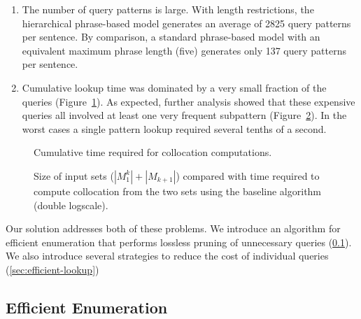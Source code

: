 \begin{enumerate}
	\item The number of query patterns is large.  With length restrictions, 
	the hierarchical phrase-based model generates an average of 
	2825 query patterns per sentence.  By comparison, a standard
	phrase-based model with an equivalent maximum phrase length
	(five) generates only 137 query patterns per sentence.

	\item Cumulative lookup time was dominated by a very small 
	fraction of the queries (Figure~\ref{fig:cumulative-baseline-timing}).  
	As expected, further analysis showed that these expensive 
	queries all involved at least one very frequent subpattern
	(Figure~\ref{fig:scatterplot-baseline}).
	In the worst cases a single pattern lookup required several 
	tenths of a second.
\end{enumerate}

\figpreamble
\begin{figure}
	\figfontsize{
	\begin{center}
		
	\end{center}}
	\figpostamble
	\caption{Cumulative time required for collocation computations.}
	\label{fig:cumulative-baseline-timing}
\end{figure}

\figpreamble
\begin{figure}
	\figfontsize{
	\begin{center}
		
	\end{center}}
	\figpostamble
	\caption{Size of input sets ($|M_1^k| + |M_{k+1}|$) compared with time required to compute collocation from the two sets using the baseline algorithm (double logscale).}
	\label{fig:scatterplot-baseline}
\end{figure}

\noindent Our solution addresses both of these problems.  We
introduce an algorithm for efficient enumeration that performs 
lossless pruning of unnecessary queries
(\textsection\ref{sec:efficient-enumeration}).  We also introduce
several strategies to reduce the cost of individual queries
(\textsection\ref{sec:efficient-lookup})

\subsection{Efficient Enumeration}
\label{sec:efficient-enumeration}


